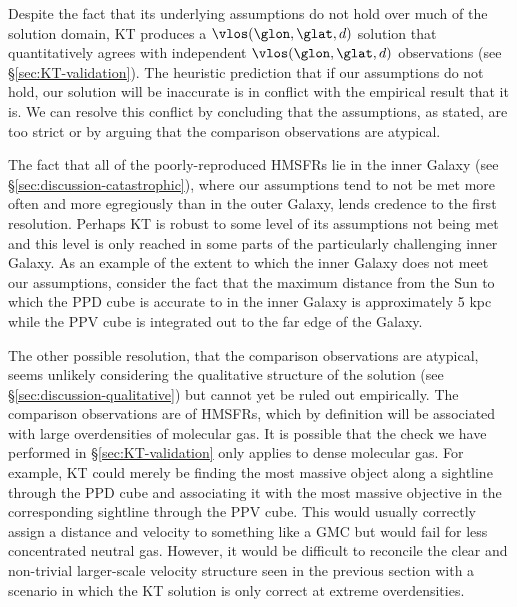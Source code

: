 Despite the fact that its underlying assumptions do not hold over much of the solution domain, KT produces a $\vlos(\glon, \glat, d)$ solution that quantitatively agrees with independent $\vlos(\glon, \glat, d)$ observations (see \S \ref{sec:KT-validation}).
The heuristic prediction that if our assumptions do not hold, our solution will be inaccurate is in conflict with the empirical result that it is.
We can resolve this conflict by concluding that the assumptions, as stated, are too strict or by arguing that the comparison observations are atypical.

The fact that all of the poorly-reproduced HMSFRs lie in the inner Galaxy (see \S \ref{sec:discussion-catastrophic}), where our assumptions tend to not be met more often and more egregiously than in the outer Galaxy, lends credence to the first resolution. 
Perhaps KT is robust to some level of its assumptions not being met and this level is only reached in some parts of the particularly challenging inner Galaxy. 
As an example of the extent to which the inner Galaxy does not meet our assumptions, consider the fact that the maximum distance from the Sun to which the PPD cube is accurate to in the inner Galaxy is approximately 5 kpc \citep{Green_2015} while the PPV cube is integrated out to the far edge of the Galaxy. 

The other possible resolution, that the comparison observations are atypical, seems unlikely considering the qualitative structure of the solution (see \S \ref{sec:discussion-qualitative}) but cannot yet be ruled out empirically. 
The comparison observations are of HMSFRs, which by definition will be associated with large overdensities of molecular gas. 
It is possible that the check we have performed in \S \ref{sec:KT-validation} only applies to dense molecular gas.
For example, KT could merely be finding the most massive object along a sightline through the PPD cube and associating it with the most massive objective in the corresponding sightline through the PPV cube. 
This would usually correctly assign a distance and velocity to something like a GMC but would fail for less concentrated neutral gas. 
However, it would be difficult to reconcile the clear and non-trivial larger-scale velocity structure seen in the previous section with a scenario in which the KT solution is only correct at extreme overdensities. 

